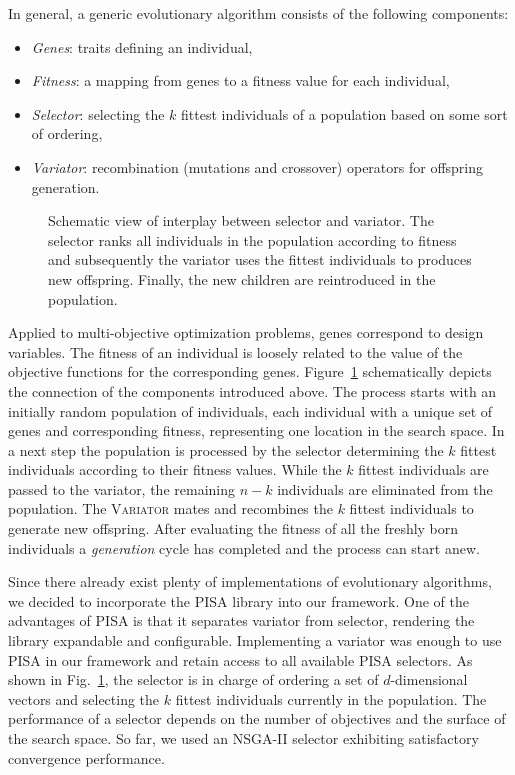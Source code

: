 \documentclass[%
reprint,
amsmath,amssymb,
aps,
prstab,
]{revtex4-1}
\begin{document}
In general, a generic evolutionary algorithm consists of the following
  components:
%
\begin{itemize}
  \item \textit{Genes}: traits defining an individual,
  \item \textit{Fitness}: a mapping from genes to a fitness value for each
    individual,
  \item \textit{Selector}: selecting the $k$ fittest individuals of a
    population based on some sort of ordering,
  \item \textit{Variator}: recombination (mutations and crossover) operators
    for offspring generation.
\end{itemize}

\begin{figure}
    \centering
    \scalebox{1}{
    \begin{tikzpicture}[scale=0.8, transform shape, text=black]
    
    \end{tikzpicture}
	}
  \caption{Schematic view of interplay between selector and variator. The
  selector ranks all individuals in the population according to fitness and
  subsequently the variator uses the fittest individuals to produces new
  offspring. Finally, the new children are reintroduced in the population.}
  \label{fig:varsel}
\end{figure}

Applied to multi-objective optimization problems, genes correspond to
  design variables.
The fitness of an individual is loosely related to the value of the objective
  functions for the corresponding genes.
Figure~\ref{fig:varsel} schematically depicts the connection of the
  components introduced above.
The process starts with an initially random population of individuals, each
  individual with a unique set of genes and corresponding fitness,
  representing one location in the search space.
In a next step the population is processed by the selector
  determining the $k$ fittest individuals according to their fitness values.
While the $k$ fittest individuals are passed to the variator, the
  remaining $n-k$ individuals are eliminated from the population.
The \textsc{Variator} mates and recombines the $k$ fittest individuals to
  generate new offspring.
After evaluating the fitness of all the freshly born individuals a
  \textit{generation} cycle has completed and the process can start anew.

Since there already exist plenty of implementations of evolutionary algorithms,
  we decided to incorporate the PISA library \cite{pisa} into our
  framework.
One of the advantages of PISA is that it separates variator from selector,
  rendering the library expandable and configurable.
Implementing a variator was enough to use PISA in our framework and
  retain access to all available PISA selectors.
As shown in Fig.~\ref{fig:varsel}, the selector is in charge of ordering a
  set of $d$-dimensional vectors and selecting the $k$ fittest individuals
  currently in the population.
The performance of a selector depends on the number of objectives and the
  surface of the search space.
So far, we used an NSGA-II selector \cite{dpam:02} exhibiting satisfactory
  convergence performance.
\end{document}
